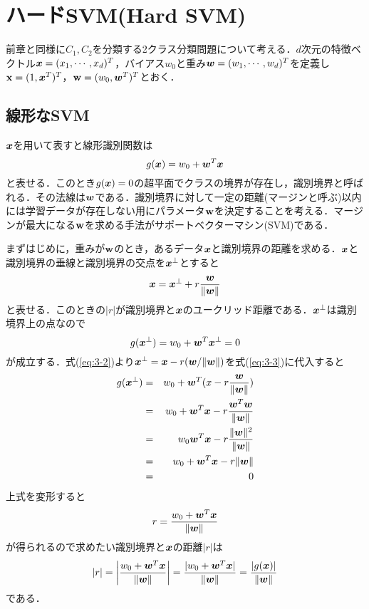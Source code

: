 \documentclass[a4j]{jsarticle}
\def\vec#1{\mbox{\boldmath $#1$}}
\begin{document}
\section{ハードSVM(Hard SVM)}
前章と同様に$C_1,C_2$を分類する2クラス分類問題について考える．$d$次元の特徴ベクトル$\vec{x}=(x_1, \cdots, x_d)^T$，バイアス$w_0$と重み$\vec{w}=(w_1,\cdots,w_d)^T$を定義し$\vec{\rm x}=(1,\vec{x}^T)^T$，$\vec{\rm w}=(w_0,\vec{w}^T)^T$とおく．
\subsection{線形なSVM}
$\vec{x}$を用いて表すと線形識別関数は
\begin{equation}
	g(\vec{x}) = w_0 + \vec{w}^T\vec{x}
\end{equation}
と表せる．このとき$g(\vec{x})=0$の超平面でクラスの境界が存在し，識別境界と呼ばれる．その法線は$\vec{w}$である．識別境界に対して一定の距離(マージンと呼ぶ)以内には学習データが存在しない用にパラメータ$\vec{\rm w}$を決定することを考える．マージンが最大になる$\vec{\rm w}$を求める手法がサポートベクターマシン(SVM)である．

まずはじめに，重みが$\vec{\rm w}$のとき，あるデータ$\vec{x}$と識別境界の距離を求める．$\vec{x}$と識別境界の垂線と識別境界の交点を$\vec{x}^\perp$とすると
\begin{equation}
	\label{eq:3-2}
	\vec{x} = \vec{x}^\perp + r \frac{\vec{w}}{\| \vec{w} \|}
\end{equation}
と表せる．このときの$|r|$が識別境界と$\vec{x}$のユークリッド距離である．$\vec{x}^\perp$は識別境界上の点なので
\begin{equation}
	\label{eq:3-3}
	g(\vec{x}^\perp) = w_0 + \vec{w}^T\vec{x}^\perp = 0
\end{equation}
が成立する．式(\ref{eq:3-2})より$\vec{x}^\perp=\vec{x}-r(\vec{w}/\|\vec{w}\|)$を式(\ref{eq:3-3})に代入すると
\begin{eqnarray}
	g(\vec{x}^\perp)&=& w_0+\vec{w}^T(x - r \frac{\vec{w}}{\|\vec{w}\|})\nonumber\\
	&=& w_0 + \vec{w}^T\vec{x}-r\frac{\vec{w}^T\vec{w}}{\|\vec{w}\|}\nonumber \\
	&=& w_0 \vec{w}^T\vec{x} - r\frac{\|\vec{w}\|^2}{\|\vec w \|} \nonumber \\
	&=& w_0 + \vec{w}^T\vec{x} - r\|\vec{w}\| \nonumber \\
	&=& 0
\end{eqnarray}
上式を変形すると
\begin{equation}
	r = \frac{w_0 + \vec{w}^T\vec{x}}{\|\vec w \|}
\end{equation}
が得られるので求めたい識別境界と$\vec{x}$の距離$|r|$は
\begin{equation}
	\label{eq:ユークリッド距離}
	|r| = \left|\frac{w_0 + \vec{w}^T\vec{x}}{\|\vec w \|}\right| = \frac{|w_0 + \vec{w}^T\vec{x}|}{\|\vec w \|} = \frac{|g(\vec x)|}{\|\vec w \|}
\end{equation}
である．
\end{document}
